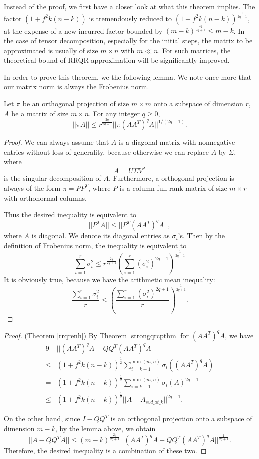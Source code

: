 \documentclass[12pt]{article}
\begin{document}
Instead of the proof, we first have a closer look at what this theorem implies. The factor $(1 + f^2k(n-k))$ is tremendously reduced to $(1 + f^2k(n-k))^\frac{1}{2q+1}$, at the expense of a new incurred factor bounded by $(m-k) ^ \frac{2q}{2q+1} \leq m - k$. In the case of tensor decomposition, especially for the initial steps, the matrix to be approximated is usually of size $m \times n$ with $m \ll n$. For such matrices, the theoretical bound of RRQR approximation will be significantly improved.

In order to prove this theorem, we the following lemma. We note once more that our matrix norm is always the Frobenius norm.
\begin{mylem}
Let $\pi$ be an orthogonal projection of size $m \times m$ onto a subspace of dimension $r$, $A$ be a matrix of size $m \times n$. For any integer $q \geq 0$,
$$ || \pi A || \leq  r^\frac{2q}{2q+1} || \pi (AA^T)^q A || ^ {1/(2q + 1)}.$$
\end{mylem}
\begin{proof}
We can always assume that $A$ is a diagonal matrix with nonnegative entries without loss of generality, because otherwise we can replace $A$ by $\Sigma$, where
$$ A = U\Sigma V^T $$
is the singular decomposition of $A$. Furthermore, a orthogonal projection is always of the form $\pi = PP^T$, where $P$ is a column full rank matrix of size $m \times r$ with orthonormal columns.

Thus the desired inequality is equivalent to
$$ || P^TA || \leq || P^T(AA^T)^q A ||, $$
where $A$ is diagonal. We denote its diagonal entries as $\sigma_i$'s. Then by the definition of Frobenius norm, the inequality is equivalent to 
$$ \sum_{i = 1}^r \sigma_i^2 \leq r^\frac{2q}{2q+1} (\sum_{i = 1}^r (\sigma_i ^ 2) ^ {2q+1}) ^ \frac{1}{2q+1}$$ 
It is obviously true, because we have the arithmetic mean inequality:
$$ \frac{\sum_{i = 1}^r \sigma_i^2}{r} \leq (\frac{\sum_{i = 1}^r (\sigma_i ^ 2) ^ {2q+1}}{r}) ^ \frac{1}{2q+1}.$$ 
\end{proof}

\begin{proof}{(Theorem \ref{rrqrenh})} 
By Theorem \ref{strongqrcpthm} for $(AA^T)^q A$, we have
\begin{alignat*}{9}
& || (AA^T)^q A - QQ^T (AA^T)^q A || \\
\leq &(1 + f^2k(n-k))^\frac{1}{2} \sum_{i = k+1}^{\min(m,n)} \sigma_i((AA^T)^q A) \\
= & (1 + f^2k(n-k))^\frac{1}{2} \sum_{i = k+1}^{\min(m,n)} \sigma_i(A) ^ {2q+1} \\
\leq & (1 + f^2k(n-k))^\frac{1}{2} || A - A_{svd\_at\_k} || ^ {2q+1}.
\end{alignat*}

On the other hand, since $I - QQ^T$ is an orthogonal projection onto a subspace of dimension $m - k$, by the lemma above, we obtain
$$|| A  - QQ^TA || \leq  (m-k)^\frac{2q}{2q+1} || (AA^T)^q A - QQ^T (AA^T)^q A || ^\frac{1}{2q+1}. $$
Therefore, the desired inequality is a combination of these two.

\end{proof}
\end{document}
